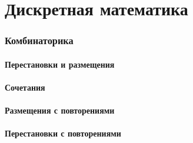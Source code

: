 \documentclass[a4paper, 12 pt]{article}
\begin{document}
\section*{}
\begin{flushleft}
\end{flushleft}

\part{Дискретная математика}
\section{Комбинаторика}
\subsection{Перестановки и размещения}
\subsection{Сочетания}
\subsection{Размещения с повторениями}
\subsection{Перестановки с повторениями}
\begin{flushleft}
\end{flushleft}
\end{document}
